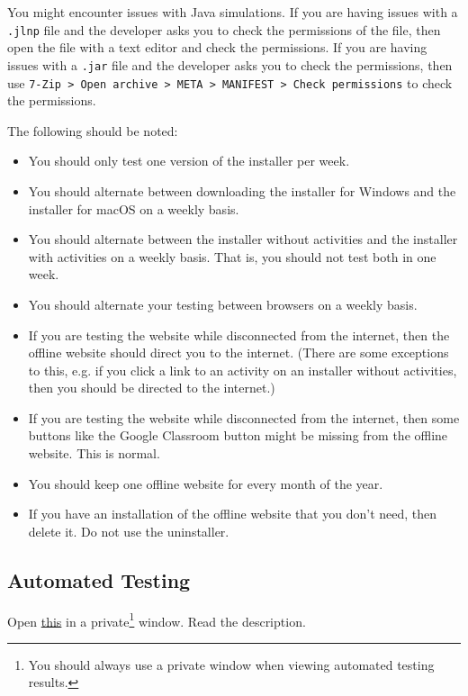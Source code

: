 \documentclass[titlepage]{article}
\begin{document}
You might encounter issues with Java simulations. If you are having issues with a \verb|.jlnp| file and the developer asks you to check the permissions of the file, then open the file with a text editor and check the permissions. If you are having issues with a \verb|.jar| file and the developer asks you to check the permissions, then use \verb|7-Zip > Open archive > META > MANIFEST > Check permissions| to check the permissions.

The following should be noted:

		\begin{itemize}
			\item You should only test one version of the installer per week.
			\item You should alternate between downloading the installer for Windows and the installer for macOS on a weekly basis.
			\item You should alternate between the installer without activities and the installer with activities on a weekly basis. That is, you should not test both in one week.
			\item You should alternate your testing between browsers on a weekly basis.
			\item If you are testing the website while disconnected from the internet, then the offline website should direct you to the internet. (There are some exceptions to this, e.g. if you click a link to an activity on an installer without activities, then you should be directed to the internet.)
			\item If you are testing the website while disconnected from the internet, then some buttons like the Google Classroom button might be missing from the offline website. This is normal.
			\item You should keep one offline website for every month of the year.
			\item If you have an installation of the offline website that you don't need, then delete it. Do not use the uninstaller.
		\end{itemize}

	\subsection{Automated Testing}

Open \href{https://bayes.colorado.edu/continuous-testing/aqua/html/continuous-report.html}{this} in a private\footnote{You should always use a private window when viewing automated testing results.} window. Read the description.
\end{document}
